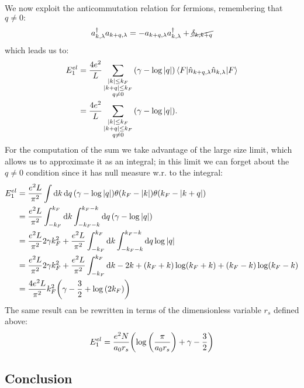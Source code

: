 \documentclass[a4paper]{article}
\begin{document}
We now exploit the anticommutation relation for fermions, remembering that $q\neq0:$
\begin{equation}
a^\dag_{k,\lambda}a_{k+q,\lambda} = -a_{k+q,\lambda}a^\dag_{k,\lambda} +\cancel{\delta_{k,k+q}}
\end{equation}
which leads us to:
\begin{align}
E_1^{el} &= \frac{4e^2}{L}\sum_{\substack{\abs{k}\leq k_F\\ \abs{k+q}\leq k_F\\q\neq0}}\pqty{\gamma - \log{\abs{q}}}\mel{F}{\hat{n}_{k+q,\lambda}\hat{n}_{k,\lambda}}{F}\\
&= \frac{4e^2}{L}\sum_{\substack{\abs{k}\leq k_F\\ \abs{k+q}\leq k_F\\q\neq0}}\pqty{\gamma - \log{\abs{q}}}.
\end{align}
For the computation of the sum we take advantage of the large size limit, which allows us to approximate it as an integral; in this limit we can forget about the $q\neq0$ condition since it has null measure w.r. to the integral:
\begin{align}
E_1^{el} &= \frac{e^2L}{\pi^2}\int\dd{k} \dd{q} \pqty{\gamma - \log{\abs{q}}}\theta\pqty{k_F - \abs{k}}\theta\pqty{k_F - \abs{k+q}}\\
& =  \frac{e^2L}{\pi^2}\int_{-k_F}^{k_F}\dd{k} \int_{-k_F - k}^{k_F - k}\dd{q} \pqty{\gamma - \log{\abs{q}}}\\
& = \frac{e^2L}{\pi^2} 2\gamma k_F^2 +\frac{e^2 L}{\pi^2} \int_{-k_F}^{k_F}\dd{k} \int_{-k_F - k}^{k_F - k}\dd{q} \log{\abs{q}}\\
& = \frac{e^2L}{\pi^2} 2\gamma k_F^2 +\frac{e^2L}{\pi^2} \int_{-k_F}^{k_F}\dd{k} -2k + (k_F+k)\log(k_F + k)+  (k_F-k)\log(k_F-k) \\
& = \frac{4e^2 L}{\pi^2} k_F^2 \pqty{\gamma-\frac{3}{2} +\log\pqty{2k_F}}
\end{align}
The same result can be rewritten in terms of the dimensionless variable $r_s$ defined above:
\begin{equation}
E_1^{el} = \frac{e^2N}{a_0r_s} \pqty{\log\pqty{\frac{\pi}{a_0r_s}} + \gamma-\frac{3}{2} }
\end{equation}

\subsection*{Conclusion}
\end{document}
